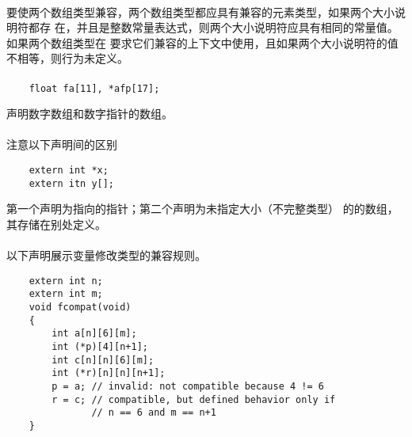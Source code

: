 {\paragraph{}
要使两个数组类型兼容，两个数组类型都应具有兼容的元素类型，如果两个大小说明符都存
在，并且是整数常量表达式，则两个大小说明符应具有相同的常量值。如果两个数组类型在
要求它们兼容的上下文中使用，且如果两个大小说明符的值不相等，则行为未定义。

\paragraph{}
\ex
\begin{lstlisting}
    float fa[11], *afp[17];
\end{lstlisting}
声明数字数组和数字指针的数组。

\paragraph{}
\ex 注意以下声明间的区别
\begin{lstlisting}
    extern int *x;
    extern itn y[];
\end{lstlisting}
第一个声明为指向的指针；第二个声明为未指定大小（不完整类型）
的的数组，其存储在别处定义。

\paragraph{}
\ex 以下声明展示变量修改类型的兼容规则。
\begin{lstlisting}
    extern int n;
    extern int m;
    void fcompat(void)
    {
        int a[n][6][m];
        int (*p)[4][n+1];
        int c[n][n][6][m];
        int (*r)[n][n][n+1];
        p = a; // invalid: not compatible because 4 != 6
        r = c; // compatible, but defined behavior only if
               // n == 6 and m == n+1
    }
\end{lstlisting}

}
